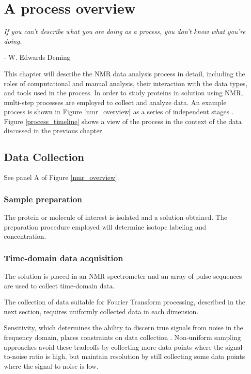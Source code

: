 \chapter{A process overview}

\begin{center}
  \textit{If you can't describe what you are doing as a process, you don't 
          know what you're doing.}

 - W. Edwards Deming
\end{center}

This chapter will describe the NMR data analysis process in detail,
including the roles of computational and manual analysis, their interaction
with the data types, and tools used in the process.
In order to study proteins in solution using NMR, multi-step processes are 
employed to collect and analyze data.  An example process is shown in 
Figure \ref{nmr_overview} as a series of independent stages 
\cite{guerry2011automated}.
Figure \ref{process_timeline} shows a view of the process in the context
of the data discussed in the previous chapter.



\section{Data Collection}

See panel A of Figure \ref{nmr_overview}.

\subsection{Sample preparation}
The protein or molecule of interest is isolated and a solution 
obtained.  The preparation procedure employed will determine isotope labeling
and concentration.

\subsection{Time-domain data acquisition}
The solution is placed in an NMR spectrometer and an array of pulse sequences
are used to collect time-domain data.

The collection of data suitable for Fourier Transform processing, described
in the next section, requires uniformly collected data in each dimension.

Sensitivity, which determines the ability to discern true signals
from noise in the frequency domain, places constraints on data collection
\cite{rovnyak2004accelerated}.  Non-uniform sampling approaches 
\cite{maciejewski2011random} avoid these tradeoffs by collecting more data
points where the signal-to-noise ratio is high, but maintain resolution by
still collecting some data points where the signal-to-noise is low.


